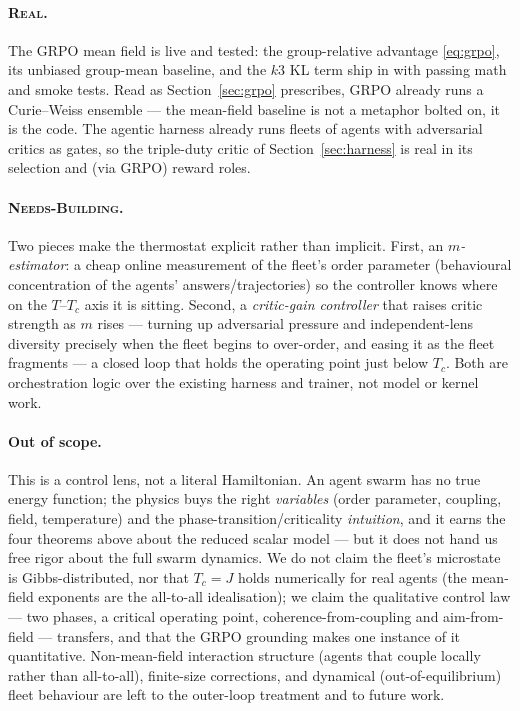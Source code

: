 \documentclass[11pt]{article}
\begin{document}
\paragraph{\textsc{Real}.} The GRPO mean field is live and tested: the group-relative advantage
\eqref{eq:grpo}, its unbiased group-mean baseline, and the $k3$ KL term ship in
 \cite{hanzo-native-training} with passing math and smoke tests. Read as
Section~\ref{sec:grpo} prescribes, GRPO already runs a Curie--Weiss ensemble --- the mean-field baseline is not
a metaphor bolted on, it is the code. The agentic harness already runs fleets of agents with adversarial critics
as gates, so the triple-duty critic of Section~\ref{sec:harness} is real in its selection and (via GRPO) reward
roles.

\paragraph{\textsc{Needs-Building}.} Two pieces make the thermostat explicit rather than implicit. First, an
\emph{$m$-estimator}: a cheap online measurement of the fleet's order parameter (behavioural concentration of
the agents' answers/trajectories) so the controller knows where on the $T$--$T_c$ axis it is sitting. Second, a
\emph{critic-gain controller} that raises critic strength as $m$ rises --- turning up adversarial pressure and
independent-lens diversity precisely when the fleet begins to over-order, and easing it as the fleet
fragments --- a closed loop that holds the operating point just below $T_c$. Both are orchestration logic over
the existing harness and trainer, not model or kernel work.

\paragraph{Out of scope.} This is a control lens, not a literal Hamiltonian. An agent swarm has no true energy
function; the physics buys the right \emph{variables} (order parameter, coupling, field, temperature) and the
phase-transition/criticality \emph{intuition}, and it earns the four theorems above about the reduced scalar
model --- but it does not hand us free rigor about the full swarm dynamics. We do not claim the fleet's
microstate is Gibbs-distributed, nor that $T_c=J$ holds numerically for real agents (the mean-field exponents
are the all-to-all idealisation); we claim the qualitative control law --- two phases, a critical operating
point, coherence-from-coupling and aim-from-field --- transfers, and that the GRPO grounding makes one instance
of it quantitative. Non-mean-field interaction structure (agents that couple locally rather than all-to-all),
finite-size corrections, and dynamical (out-of-equilibrium) fleet behaviour are left to the outer-loop treatment
\cite{hanzo-evolutionary-orchestration} and to future work.
\end{document}
